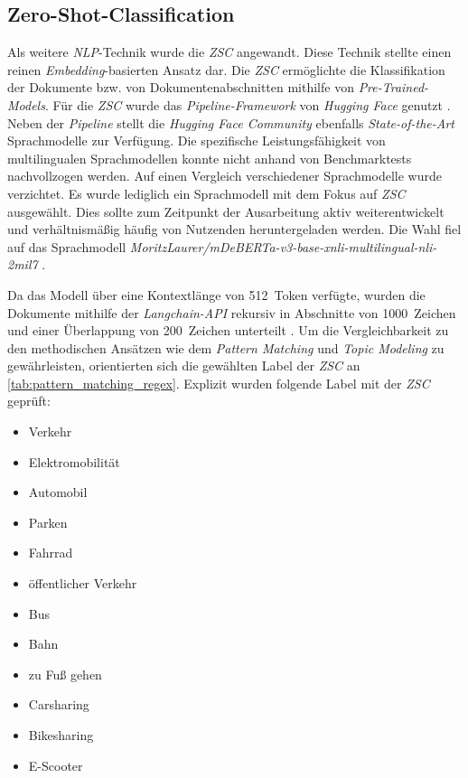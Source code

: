 
\subsection{Zero-Shot-Classification}

Als weitere \textit{NLP}-Technik wurde die \textit{ZSC} angewandt. Diese Technik stellte einen reinen \textit{Embedding}-basierten Ansatz dar. Die \textit{ZSC} ermöglichte die Klassifikation der Dokumente bzw. von Dokumentenabschnitten mithilfe von \textit{Pre-Trained-Models}. Für die \textit{ZSC} wurde das \textit{Pipeline-Framework} von \textit{Hugging Face} genutzt \parencite{huggingfaceb}. Neben der \textit{Pipeline} stellt die \textit{Hugging Face Community} ebenfalls \textit{State-of-the-Art} Sprachmodelle zur Verfügung. Die spezifische Leistungsfähigkeit von multilingualen Sprachmodellen konnte nicht anhand von Benchmarktests nachvollzogen werden. Auf einen Vergleich verschiedener Sprachmodelle wurde verzichtet. Es wurde lediglich ein Sprachmodell mit dem Fokus auf \textit{ZSC} ausgewählt. Dies sollte zum Zeitpunkt der Ausarbeitung aktiv weiterentwickelt und verhältnismäßig häufig von Nutzenden heruntergeladen werden. Die Wahl fiel auf das Sprachmodell \textit{MoritzLaurer/mDeBERTa-v3-base-xnli-multilingual-nli-2mil7} \parencite{laurer2022,laurer2023}.

Da das Modell über eine Kontextlänge von 512~Token verfügte, wurden die Dokumente mithilfe der \textit{Langchain-API} rekursiv in Abschnitte von 1000~Zeichen und einer Überlappung von 200~Zeichen unterteilt \parencite{langchain}. Um die Vergleichbarkeit zu den methodischen Ansätzen wie dem \textit{Pattern Matching} und \textit{Topic Modeling} zu gewährleisten, orientierten sich die gewählten Label der \textit{ZSC} an \autoref{tab:pattern_matching_regex}. Explizit wurden folgende Label mit der \textit{ZSC} geprüft:

\begin{multicols}{3}
    \begin{itemize}
        \item Verkehr
        \item Elektromobilität
        \item Automobil
        \item Parken
        \item Fahrrad
        \item öffentlicher Verkehr
        \item Bus
        \item Bahn
        \item zu Fuß gehen
        \item Carsharing
        \item Bikesharing
        \item E-Scooter
    \end{itemize}
\end{multicols}

